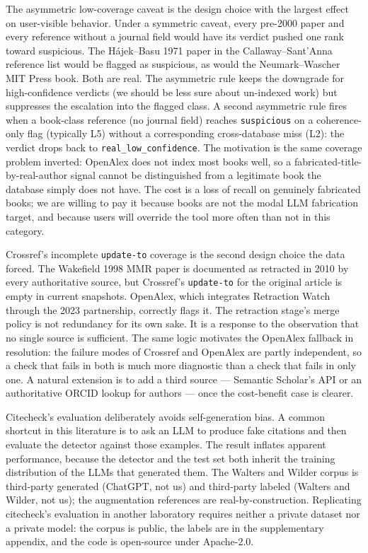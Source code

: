 \documentclass[12pt]{article}
\begin{document}
The asymmetric low-coverage caveat is the design choice with the largest effect on user-visible behavior. Under a symmetric caveat, every pre-2000 paper and every reference without a journal field would have its verdict pushed one rank toward suspicious. The Hájek--Basu 1971 paper in the Callaway--Sant'Anna reference list \citep{callaway_santanna_2021_preprint} would be flagged as suspicious, as would the Neumark--Wascher MIT Press book. Both are real. The asymmetric rule keeps the downgrade for high-confidence verdicts (we should be less sure about un-indexed work) but suppresses the escalation into the flagged class. A second asymmetric rule fires when a book-class reference (no journal field) reaches \texttt{suspicious} on a coherence-only flag (typically L5) without a corresponding cross-database miss (L2): the verdict drops back to \texttt{real\_low\_confidence}. The motivation is the same coverage problem inverted: OpenAlex does not index most books well, so a fabricated-title-by-real-author signal cannot be distinguished from a legitimate book the database simply does not have. The cost is a loss of recall on genuinely fabricated books; we are willing to pay it because books are not the modal LLM fabrication target, and because users will override the tool more often than not in this category.

Crossref's incomplete \texttt{update-to} coverage is the second design choice the data forced. The Wakefield 1998 MMR paper is documented as retracted in 2010 by every authoritative source, but Crossref's \texttt{update-to} for the original article is empty in current snapshots. OpenAlex, which integrates Retraction Watch through the 2023 partnership, correctly flags it. The retraction stage's merge policy is not redundancy for its own sake. It is a response to the observation that no single source is sufficient. The same logic motivates the OpenAlex fallback in resolution: the failure modes of Crossref and OpenAlex are partly independent, so a check that fails in both is much more diagnostic than a check that fails in only one. A natural extension is to add a third source --- Semantic Scholar's API or an authoritative ORCID lookup for authors --- once the cost-benefit case is clearer.

Citecheck's evaluation deliberately avoids self-generation bias. A common shortcut in this literature is to ask an LLM to produce fake citations and then evaluate the detector against those examples. The result inflates apparent performance, because the detector and the test set both inherit the training distribution of the LLMs that generated them. The Walters and Wilder corpus is third-party generated (ChatGPT, not us) and third-party labeled (Walters and Wilder, not us); the augmentation references are real-by-construction. Replicating citecheck's evaluation in another laboratory requires neither a private dataset nor a private model: the corpus is public, the labels are in the supplementary appendix, and the code is open-source under Apache-2.0.
\end{document}
